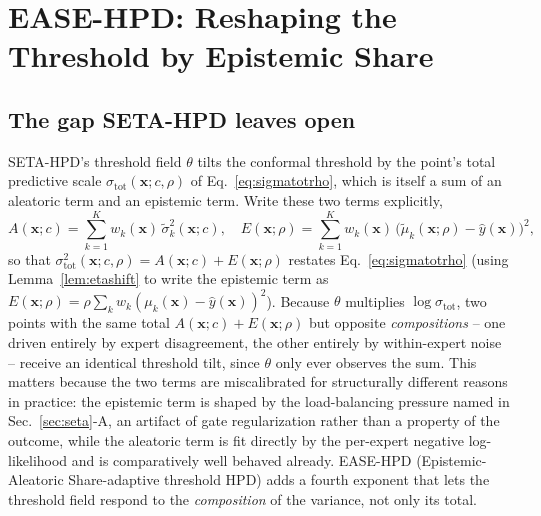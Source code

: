 \documentclass[10pt,twocolumn,a4paper]{article}
\begin{document}
\section{EASE-HPD: Reshaping the Threshold by Epistemic Share}
\label{sec:ease}

\subsection{The gap SETA-HPD leaves open}
SETA-HPD's threshold field $\theta$ tilts the conformal threshold by the point's total predictive
scale $\sigma_{\mathrm{tot}}(\bm x;c,\rho)$ of Eq.~\eqref{eq:sigmatotrho}, which is itself a sum of an
aleatoric term and an epistemic term. Write these two terms explicitly,
\begin{equation}
A(\bm x;c) = \sum_{k=1}^K w_k(\bm x)\,\tilde\sigma_k^2(\bm x;c), \quad
E(\bm x;\rho) = \sum_{k=1}^K w_k(\bm x)\,\big(\tilde\mu_k(\bm x;\rho)-\hat y(\bm x)\big)^2,
\label{eq:aeterms}
\end{equation}
so that $\sigma_{\mathrm{tot}}^2(\bm x;c,\rho) = A(\bm x;c) + E(\bm x;\rho)$ restates
Eq.~\eqref{eq:sigmatotrho} (using Lemma~\ref{lem:etashift} to write the epistemic term as
$E(\bm x;\rho)=\rho\sum_k w_k(\mu_k(\bm x)-\hat y(\bm x))^2$). Because $\theta$ multiplies
$\log\sigma_{\mathrm{tot}}$, two points with the same total $A(\bm x;c)+E(\bm x;\rho)$ but opposite
\emph{compositions} -- one driven entirely by expert disagreement, the other entirely by
within-expert noise -- receive an identical threshold tilt, since $\theta$ only ever observes the
sum. This matters because the two terms are miscalibrated for structurally different reasons in
practice: the epistemic term is shaped by the load-balancing pressure named in
Sec.~\ref{sec:seta}-A, an artifact of gate regularization rather than a property of the outcome,
while the aleatoric term is fit directly by the per-expert negative log-likelihood and is
comparatively well behaved already. EASE-HPD (Epistemic-Aleatoric Share-adaptive threshold HPD) adds
a fourth exponent that lets the threshold field respond to the \emph{composition} of the variance,
not only its total.
\end{document}
